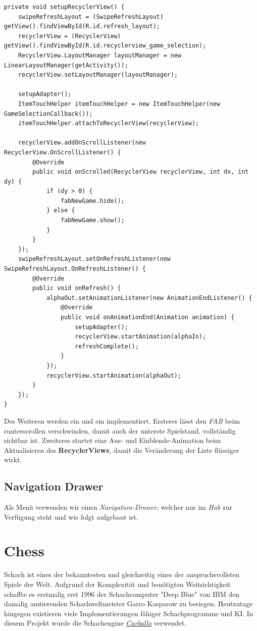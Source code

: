 \begin{lstlisting}[caption={Spielehub setupRecyclerView() Methode},captionpos=b]
private void setupRecyclerView() {
	swipeRefreshLayout = (SwipeRefreshLayout) getView().findViewById(R.id.refresh_layout);
	recyclerView = (RecyclerView) getView().findViewById(R.id.recyclerview_game_selection);
	RecyclerView.LayoutManager layoutManager = new LinearLayoutManager(getActivity());
	recyclerView.setLayoutManager(layoutManager);

	setupAdapter();
	ItemTouchHelper itemTouchHelper = new ItemTouchHelper(new GameSelectionCallback());
	itemTouchHelper.attachToRecyclerView(recyclerView);

	recyclerView.addOnScrollListener(new RecyclerView.OnScrollListener() {
		@Override
		public void onScrolled(RecyclerView recyclerView, int dx, int dy) {
			if (dy > 0) {
				fabNewGame.hide();
			} else {
				fabNewGame.show();
			}
		}
	});
	swipeRefreshLayout.setOnRefreshListener(new SwipeRefreshLayout.OnRefreshListener() {
		@Override
		public void onRefresh() {
			alphaOut.setAnimationListener(new AnimationEndListener() {
				@Override
				public void onAnimationEnd(Animation animation) {
					setupAdapter();
					recyclerView.startAnimation(alphaIn);
					refreshComplete();
				}
			});
			recyclerView.startAnimation(alphaOut);
		}
	});
}
\end{lstlisting}

Des Weiteren werden ein  und ein
 implementiert. Ersteres lässt den \emph{FAB}
beim runterscrollen verschwinden, damit auch der unterste Spielstand,
vollständig sichtbar ist. Zweiteres startet eine Aus- und Einblende-Animation
beim Aktualisieren des \textbf{RecyclerViews}, damit die Veränderung der Liste
flüssiger wirkt.

\subsection{Navigation Drawer}

Als Menü verwenden wir einen \emph{Navigation-Drawer}, welcher nur im \emph{Hub}
zur Verfügung steht und wie folgt aufgebaut ist.


\section{Chess}
\sectionauthor{\oliver}

Schach ist eines der bekanntesten und gleichzeitig eines der anspruchsvollsten
Spiele der Welt. Aufgrund der Komplexität und benötigten Weitsichtigkeit
schaffte es erstmalig erst 1996 der Schachcomputer "Deep Blue" von IBM den
damalig amtierenden Schachweltmeister Garro Kasparow zu besiegen.
 Heutzutage hingegen existieren viele Implementierungen
fähiger Schachprogramme und KI. In diesem Projekt wurde die Schachengine
\hyperlink{https://github.com/albertoruibal/carballo}{\emph{Carballo}}
verwendet.  

